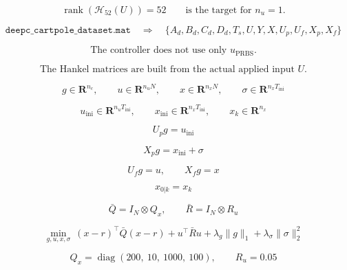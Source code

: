 \[
\operatorname{rank}\!\left(\mathcal{H}_{52}(U)\right)=52
\qquad
\text{is the target for } n_u=1.
\]


\[
\texttt{deepc\_cartpole\_dataset.mat}
\quad\Longrightarrow\quad
\{A_d,B_d,C_d,D_d,T_s,U,Y,X,U_p,U_f,X_p,X_f\}
\]

\[
\text{The controller does not use only }u_{\mathrm{PRBS}}.
\]

\[
\boxed{
\text{The Hankel matrices are built from the actual applied input }U.
}
\]


\[
g\in\mathbf{R}^{n_c},
\qquad
u\in\mathbf{R}^{n_uN},
\qquad
x\in\mathbf{R}^{n_xN},
\qquad
\sigma\in\mathbf{R}^{n_xT_{\mathrm{ini}}}
\]

\[
u_{\mathrm{ini}}\in\mathbf{R}^{n_uT_{\mathrm{ini}}},
\qquad
x_{\mathrm{ini}}\in\mathbf{R}^{n_xT_{\mathrm{ini}}},
\qquad
x_k\in\mathbf{R}^{n_x}
\]


\[
U_p g = u_{\mathrm{ini}}
\]

\[
X_p g = x_{\mathrm{ini}}+\sigma
\]

\[
U_f g = u,
\qquad
X_f g = x
\]

\[
x_{0|k}=x_k
\]


\[
\bar Q=I_N\otimes Q_x,
\qquad
\bar R=I_N\otimes R_u
\]

\[
\min_{g,u,x,\sigma}
\ (x-r)^{\top}\bar Q(x-r)
+u^{\top}\bar R u
+\lambda_g\|g\|_1
+\lambda_{\sigma}\|\sigma\|_2^2
\]

\[
Q_x=\operatorname{diag}(200,\ 10,\ 1000,\ 100),
\qquad
R_u=0.05
\]

